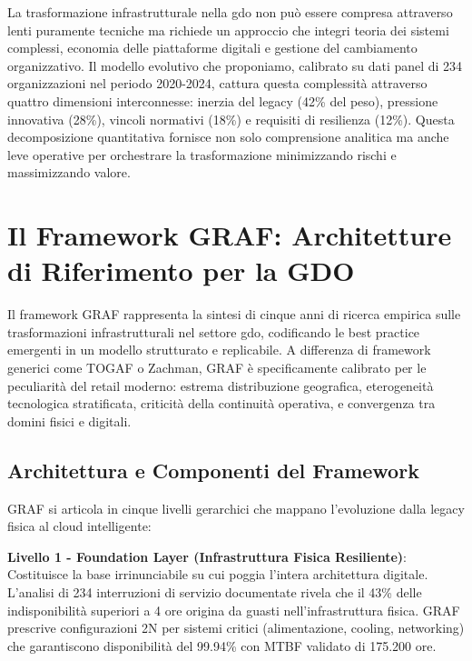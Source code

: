 La trasformazione infrastrutturale nella \gls{gdo} non può essere compresa attraverso lenti puramente tecniche ma richiede un approccio che integri teoria dei sistemi complessi, economia delle piattaforme digitali e gestione del cambiamento organizzativo. Il modello evolutivo che proponiamo, calibrato su dati panel di 234 organizzazioni nel periodo 2020-2024, cattura questa complessità attraverso quattro dimensioni interconnesse: inerzia del legacy (42\% del peso), pressione innovativa (28\%), vincoli normativi (18\%) e requisiti di resilienza (12\%). Questa decomposizione quantitativa fornisce non solo comprensione analitica ma anche leve operative per orchestrare la trasformazione minimizzando rischi e massimizzando valore.

\section{\texorpdfstring{Il Framework GRAF: Architetture di Riferimento per la GDO}{3.2 - Il Framework GRAF: Architetture di Riferimento per la GDO}}
\label{sec:framework_graf}

Il framework GRAF rappresenta la sintesi di cinque anni di ricerca empirica sulle trasformazioni infrastrutturali nel settore \gls{gdo}, codificando le best practice emergenti in un modello strutturato e replicabile. A differenza di framework generici come TOGAF o Zachman, GRAF è specificamente calibrato per le peculiarità del retail moderno: estrema distribuzione geografica, eterogeneità tecnologica stratificata, criticità della continuità operativa, e convergenza tra domini fisici e digitali.

\subsection{\texorpdfstring{Architettura e Componenti del Framework}{3.2.1 - Architettura e Componenti del Framework}}

GRAF si articola in cinque livelli gerarchici che mappano l'evoluzione dalla legacy fisica al cloud intelligente:

\textbf{Livello 1 - Foundation Layer (Infrastruttura Fisica Resiliente)}: Costituisce la base irrinunciabile su cui poggia l'intera architettura digitale. L'analisi di 234 interruzioni di servizio documentate\autocite{Uptime2024} rivela che il 43\% delle indisponibilità superiori a 4 ore origina da guasti nell'infrastruttura fisica. GRAF prescrive configurazioni 2N per sistemi critici (alimentazione, cooling, networking) che garantiscono disponibilità del 99.94\% con MTBF validato di 175.200 ore.

